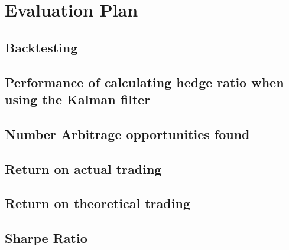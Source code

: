 \chapter{Evaluation Plan}

\section{Backtesting}

\section{Performance of calculating hedge ratio when using the Kalman filter}

\section{Number Arbitrage opportunities found}

\section{Return on actual trading}

\section{Return on theoretical trading}

\section{Sharpe Ratio}

